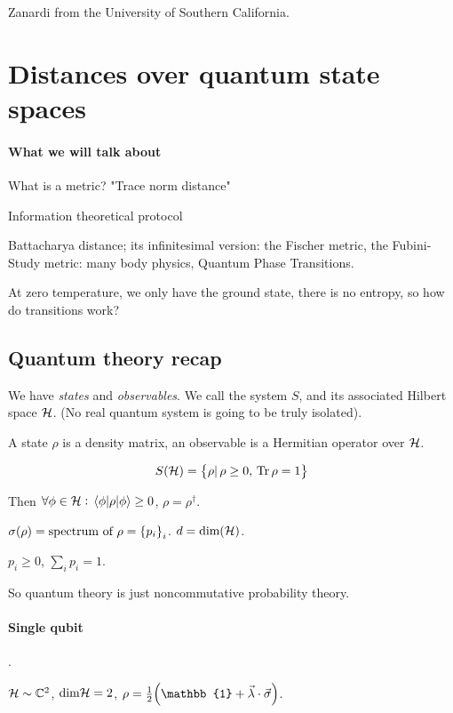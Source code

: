 Zanardi from the University of Southern California.

\section{Distances over quantum state spaces}

\paragraph{What we will talk about}

What is a metric? "Trace norm distance"

Information theoretical protocol

Battacharya distance; its infinitesimal version: the Fischer metric, the Fubini-Study metric: many body physics, Quantum Phase Transitions.

At zero temperature, we only have the ground state, there is no entropy, so how do transitions work?

\subsection{Quantum theory recap}

We have \emph{states} and \emph{observables}. We call the system $S$, and its associated Hilbert space \(\mathcal{H}\). (No real quantum system is going to be truly isolated).

A state \(\rho\) is a density matrix, an observable is a Hermitian operator over \(\mathcal{H}\).

\begin{equation}
  S(\mathcal{H}) = \qty{\rho |\, \rho \geq 0, \, \Tr \rho = 1}
\end{equation}

Then \(\forall \phi \in \H: \ev{\rho}{\phi} \geq 0\), \(\rho = \rho ^\dag\).

\(\sigma (\rho) = \text{spectrum of } \rho = \qty{p_i}_i\). \(d = \text{dim} (\mathcal{H})\).

\(p_i \geq 0\), \(\sum_i p_i = 1\).

So quantum theory is just noncommutative probability theory. 

\paragraph{Single qubit}.

$\mathcal{H} \sim \mathbb{C}^2$, $\text{dim} \mathcal{H} = 2$, $\rho = \frac{1}{2} \qty(\mathbb{1} + \vec{\lambda} \cdot \vec{\sigma})$.

